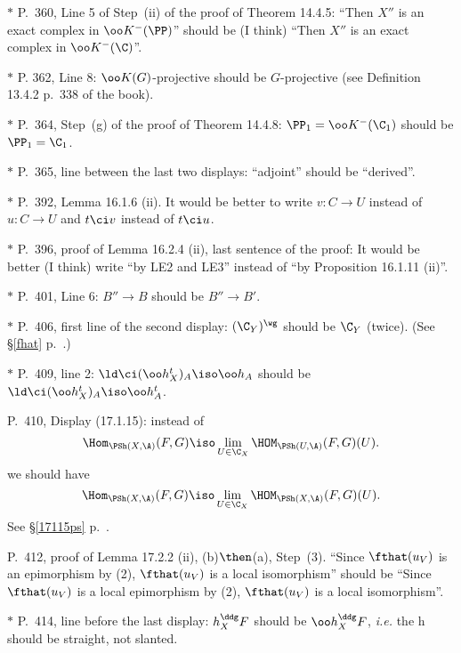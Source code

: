 \documentclass[12pt]{article}
\theoremstyle{remark}
\theoremstyle{definition}
\begin{document}

\nn$*$ P.~360, Line 5 of Step~(ii) of the proof of Theorem 14.4.5: ``Then $X''$ is an exact complex in $\oo K^-(\PP)$'' should be (I think) ``Then $X''$ is an exact complex in $\oo K^-(\C)$''.

\nn$*$ P. 362, Line 8: $\oo K(G)$-projective should be $G$-projective (see Definition 13.4.2 p.~338 of the book).

\nn$*$ P.~364, Step~(g) of the proof of Theorem 14.4.8: $\PP_1=\oo K^-(\C_1)$ should be $\PP_1=\C_1$.

\nn$*$ P.~365, line between the last two displays: ``adjoint'' should be ``derived''.

\nn$*$ P.~392, Lemma 16.1.6 (ii). It would be better to write $v:C\to U$ instead of $u:C\to U$ and $t\ci v$ instead of $t\ci u$.

\nn$*$ P.~396, proof of Lemma 16.2.4 (ii), last sentence of the proof: It would be better (I think) write ``by LE2 and LE3'' instead of ``by Proposition 16.1.11 (ii)''.

\nn$*$ P.~401, Line 6: $B''\to B$ should be $B''\to B'$.

\nn$*$ P.~406, first line of the second display: $(\C_Y)^\wg$ should be $\C_Y$ (twice). (See \S\ref{fhat} p.~.)

\nn$*$ P.~409, line 2: $\ld\ci(\oo h_X^t)_A\iso\oo h_A$ should be $\ld\ci(\oo h_X^t)_A\iso\oo h_A^t$. 

\begin{s}
P.~410, Display (17.1.15): instead of 
$$
\Hom_{\PSh(X,\A)}(F,G)\iso\lim_{U\in\C_X}\HOM_{\PSh(U,\A)}(F,G)(U).
$$
we should have
$$
\Hom_{\PSh(X,\A)}(F,G)\iso\lim_{U\in\C_X}\HOM_{\PSh(X,\A)}(F,G)(U).
$$ 
See \S\ref{17115ps} p.~. 
\end{s}

%

\begin{s}
P.~412, proof of Lemma 17.2.2 (ii), (b)$\then$(a), Step~(3). ``Since $\fthat(u_V)$ is an epimorphism by (2), $\fthat(u_V)$ is a local isomorphism'' should be ``Since $\fthat(u_V)$ is a local epimorphism by (2), $\fthat(u_V)$ is a local isomorphism''.
\end{s}

\nn$*$ P.~414, line before the last display: $h_X^\ddg F$ should be $\oo h_X^\ddg F$, \emph{i.e.} the h should be straight, not slanted. 
\end{document}
